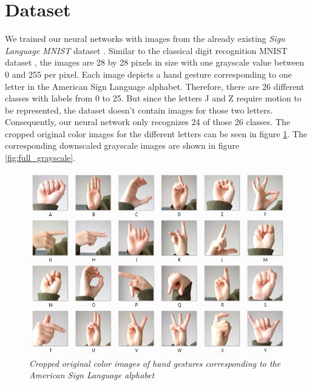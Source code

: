 \documentclass[a4paper]{article}
\begin{document}
\section{Dataset}
\label{ch:dataset}

We trained our neural networks with images from the already existing \textit{Sign Language MNIST} dataset \cite{DatasetKaggle}. Similar to the classical digit recognition MNIST dataset \cite{MNIST}, the images are 28 by 28 pixels in size with one grayscale value between 0 and 255 per pixel. Each image depicts a hand gesture corresponding to one letter in the American Sign Language alphabet. Therefore, there are 26 different classes with labels from 0 to 25. But since the letters J and Z require motion to be represented, the dataset doesn't contain images for those two letters. Consequently, our neural network only recognizes 24 of those 26 classes. The cropped original color images for the different letters can be seen in figure \ref{fig:full_colored}. The corresponding downscaled grayscale images are shown in figure \ref{fig:full_grayscale}.

\begin{figure}
     \centering
     \includegraphics[width=1\linewidth]{graphics/dataset/amer_sign2.png}
     \caption{\textit{Cropped original color images of hand gestures corresponding to the American Sign Language alphabet \cite{DatasetKaggle}}}
     \label{fig:full_colored}
\end{figure}
\end{document}
